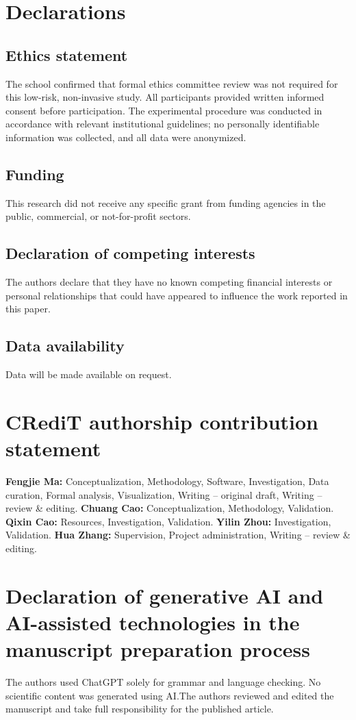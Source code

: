 \section*{Declarations}
\subsection*{Ethics statement}
The school confirmed that formal ethics committee review was not required for this low-risk, non-invasive study. All participants provided written informed consent before participation. The experimental procedure was conducted in accordance with relevant institutional guidelines; no personally identifiable information was collected, and all data were anonymized.

\subsection*{Funding}
This research did not receive any specific grant from funding agencies in the public, commercial, or not-for-profit sectors.

\subsection*{Declaration of competing interests}
The authors declare that they have no known competing financial interests or personal relationships that could have appeared to influence the work reported in this paper.

\subsection*{Data availability}
Data will be made available on request.

\section*{CRediT authorship contribution statement}
\noindent\textbf{Fengjie Ma:} Conceptualization, Methodology, Software, Investigation, Data curation, Formal analysis, Visualization, Writing -- original draft, Writing -- review \& editing. \textbf{Chuang Cao:} Conceptualization, Methodology, Validation. \textbf{Qixin Cao:} Resources, Investigation, Validation. \textbf{Yilin Zhou:} Investigation, Validation. \textbf{Hua Zhang:} Supervision, Project administration, Writing -- review \& editing.

\section*{Declaration of generative AI and AI-assisted technologies in the manuscript preparation process}
The authors used ChatGPT solely for grammar and language checking. No scientific content was generated using AI.\@ The authors reviewed and edited the manuscript and take full responsibility for the published article.
